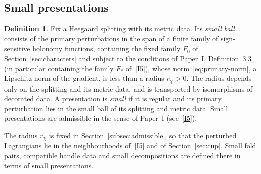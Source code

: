 \documentclass[11pt]{amsart}
\theoremstyle{definition}
\newtheorem{definition}[theorem]{Definition}
\theoremstyle{remark}
\theoremstyle{plain}
\numberwithin{equation}{section}
\begin{document}
\subsection{Small presentations}\label{subsec:admissible-intro}
\begin{definition}\label{def:admissible-intro}
Fix a Heegaard splitting with its metric data. Its \emph{small ball} consists of the primary
perturbations in the span of a finite family of sign-sensitive holonomy functions, containing the
fixed family $F_0$ of Section~\ref{sec:characters} and subject to the conditions of Paper~I,
Definition~3.3 (in particular containing the family $F_*$ of~\ref{I5}), whose
norm~\eqref{eq:primary-norm}, a Lipschitz norm of the gradient, is less than
a radius $r_\chi>0$. The radius depends only on the splitting and its metric data, and is transported by isomorphisms of decorated data. A presentation is
\emph{small} if it is regular and its primary perturbation lies in the small ball of its splitting and metric data. Small presentations are admissible in the sense of Paper~I (see~\ref{I5}).
\end{definition}

The radius $r_\chi$ is fixed in Section~\ref{subsec:admissible}, so that the perturbed Lagrangians
lie in the neighbourhoods of~\ref{I5} and of Section~\ref{sec:cup}. Small fold pairs, compatible
handle data and small decompositions are defined there in terms of small presentations.
\end{document}
